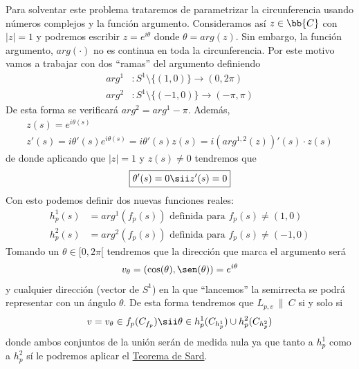Para solventar este problema trataremos de parametrizar la circunferencia usando números complejos y la función argumento. Consideramos así $z\in \bb{C}$ con $|z|=1$ y podremos escribir $z = e^{i\theta}$ donde $\theta = arg(z)$. Sin embargo, la función argumento, $arg(\cdot)$ no es continua en toda la circunferencia. Por este motivo vamos a trabajar con dos ``ramas'' del argumento definiendo
\begin{align*}
    arg^1 &: S^1 \setminus \{(1,0)\} \to (0,2\pi)\\
    arg^2 &: S^1 \setminus \{(-1,0)\} \to (-\pi,\pi)
\end{align*}
De esta forma se verificará $arg^2 = arg^1 - \pi$. Además, 
\begin{gather*}
    z(s) = e^{i\theta(s)}\\
    z'(s) = i\theta'(s)e^{i\theta(s)} = i\theta'(s)z(s) = i(arg^{1,2}(z))'(s) \cdot z(s)
\end{gather*}
de donde aplicando que $|z| = 1$ y $z(s) \neq 0$ tendremos que 
\begin{gather*}
    \boxed{\theta'(s) = 0 \sii z'(s) = 0}
\end{gather*}
Con esto podemos definir dos nuevas funciones reales:
\begin{align*}
    h^1_p(s) &= arg^1 (f_p(s)) \text{ definida para } f_p(s) \neq (1,0)\\
    h^2_p(s) &= arg^2 (f_p(s)) \text{ definida para } f_p(s) \neq (-1,0)
\end{align*}
Tomando un $\theta\in [0,2\pi[$ tendremos que la dirección que marca el argumento será 
\begin{gather*}
    v_\theta = (\cos(\theta), \sen(\theta)) = e^{i\theta}
\end{gather*}
y cualquier dirección (vector de $S^1$) en la que ``lancemos'' la semirrecta se podrá representar con un ángulo $\theta$. De esta forma tendremos que $L_{p,v} \ \| \ C$ si y solo si 
\begin{gather*}
    v=v_\theta \in f_p(C_{f_p}) \sii \theta \in h_p^1(C_{h_p^1}) \cup h_p^2(C_{h_p^2})
\end{gather*}
donde ambos conjuntos de la unión serán de medida nula ya que tanto a $h_p^1$ como a $h_p^2$ sí le podremos aplicar el \hyperref[teo:sard]{Teorema de Sard}.\\

